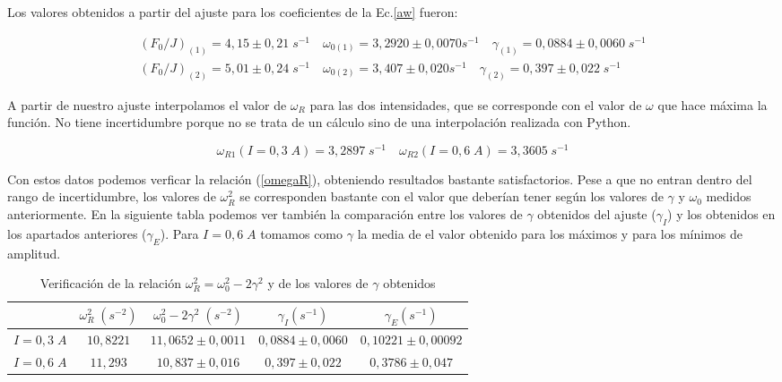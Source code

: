\documentclass[a4paper,12pt,titlepage]{article}
\begin{document}
Los valores obtenidos a partir del ajuste para los coeficientes de la Ec.\ref{aw} fueron:

\begin{equation}
    \begin{gathered}
        (F_0/J)_{(1)} = 4,15 \pm 0,21 \;s^{-1} \quad \omega_{0(1)} = 3,2920 \pm 0,0070 s^{-1} \quad \gamma_{(1)} = 0,0884 \pm 0,0060 \;s^{-1} \\
        (F_0/J)_{(2)} = 5,01 \pm 0,24 \;s^{-1} \quad \omega_{0(2)} = 3,407 \pm 0,020 s^{-1} \quad \gamma_{(2)} = 0,397 \pm 0,022 \;s^{-1}
    \end{gathered}
\end{equation}

A partir de nuestro ajuste interpolamos el valor de $\omega_R$ para las dos intensidades, que se corresponde con el valor de $\omega$ que hace máxima la función. No tiene incertidumbre porque no se trata de un cálculo sino de una interpolación realizada con Python. 

\begin{equation}
    \omega_{R1}(I=0,3\;A) = 3,2897 \;s^{-1} \quad \omega_{R2}(I=0,6\;A)= 3,3605 \; s^{-1}
\end{equation}

Con estos datos podemos verficar la relación (\ref{omegaR}), obteniendo resultados bastante satisfactorios. Pese a que no entran dentro del rango de incertidumbre, los valores de $\omega_R^2$ se corresponden bastante con el valor que deberían tener según los valores de $\gamma$ y $\omega_0$ medidos anteriormente. En la siguiente tabla podemos ver también la comparación entre los valores de $\gamma$ obtenidos del ajuste ($\gamma_I$) y los obtenidos en los apartados anteriores ($\gamma_E$). Para $I=0,6\;A$ tomamos como $\gamma$ la media de el valor obtenido para los máximos y para los mínimos de amplitud.

\begin{table}[h!]
    \centering
    \begin{tabular}{c|c|c|c|c|}
    \cline{2-5}
        & $\omega_R^2\;(s^{-2})$ & $\omega_0^2-2\gamma^2\;(s^{-2})$ & $\gamma_I(s^{-1})$ & $\gamma_E(s^{-1})$\\ \hline
    \multicolumn{1}{|c|}{$I=0,3\; A$}  & $10,8221$   &  $11,0652 \pm 0,0011$ & $0,0884\pm0,0060$ & $0,10221 \pm 0,00092$\\ \hline
    \multicolumn{1}{|c|}{$I=0,6\;A$} & $11,293$ & $10,837 \pm 0,016$ & $0,397\pm 0,022$ &  $0,3786 \pm 0,047$ \\ \hline
    \end{tabular}
    \caption{Verificación de la relación $\omega_R^2=\omega_0^2-2\gamma^2$ y de los valores de $\gamma$ obtenidos}
    \label{tab:my-table}
    \end{table}
\end{document}
